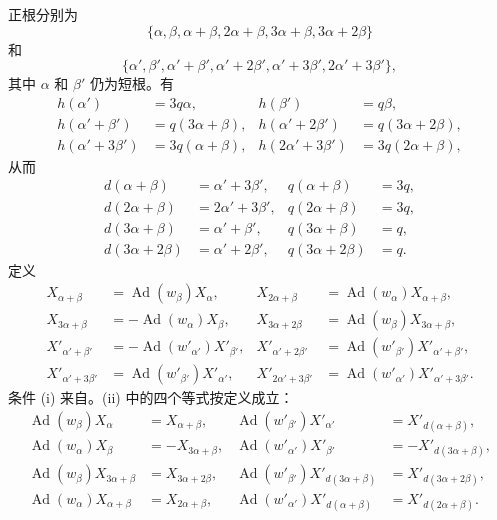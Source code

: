正根分别为
\[
\{\alpha,\beta,\alpha+\beta,2\alpha+\beta,3\alpha+\beta,
  3\alpha+2\beta\}
\]
和
\[
\{\alpha',\beta',\alpha'+\beta',\alpha'+2\beta',
  \alpha'+3\beta',2\alpha'+3\beta'\},
\]
其中 \(\alpha\) 和 \(\beta'\) 仍为短根。有
\[
\begin{aligned}
 h(\alpha')&=3q\alpha,&h(\beta')&=q\beta,\\
 h(\alpha'+\beta')&=q(3\alpha+\beta),&
 h(\alpha'+2\beta')&=q(3\alpha+2\beta),\\
 h(\alpha'+3\beta')&=3q(\alpha+\beta),&
 h(2\alpha'+3\beta')&=3q(2\alpha+\beta),
\end{aligned}
\]
从而
\[
\begin{aligned}
 d(\alpha+\beta)&=\alpha'+3\beta',&q(\alpha+\beta)&=3q,\\
 d(2\alpha+\beta)&=2\alpha'+3\beta',&q(2\alpha+\beta)&=3q,\\
 d(3\alpha+\beta)&=\alpha'+\beta',&q(3\alpha+\beta)&=q,\\
 d(3\alpha+2\beta)&=\alpha'+2\beta',&q(3\alpha+2\beta)&=q.
\end{aligned}
\]
定义
\[
\begin{aligned}
 X_{\alpha+\beta}&=\operatorname{Ad}(w_\beta)X_\alpha,&
 X_{2\alpha+\beta}&=\operatorname{Ad}(w_\alpha)X_{\alpha+\beta},\\
 X_{3\alpha+\beta}&=-\operatorname{Ad}(w_\alpha)X_\beta,&
 X_{3\alpha+2\beta}&=\operatorname{Ad}(w_\beta)X_{3\alpha+\beta},\\
 X'_{\alpha'+\beta'}&=-\operatorname{Ad}(w'_{\alpha'})X'_{\beta'},&
 X'_{\alpha'+2\beta'}&=\operatorname{Ad}(w'_{\beta'})X'_{\alpha'+\beta'},\\
 X'_{\alpha'+3\beta'}&=\operatorname{Ad}(w'_{\beta'})X'_{\alpha'},&
 X'_{2\alpha'+3\beta'}&=\operatorname{Ad}(w'_{\alpha'})X'_{\alpha'+3\beta'}.
\end{aligned}
\]
条件 (i) 来自。(ii) 中的四个等式按定义成立：
\[
\begin{aligned}
 \operatorname{Ad}(w_\beta)X_\alpha&=X_{\alpha+\beta},&
 \operatorname{Ad}(w'_{\beta'})X'_{\alpha'}&=X'_{d(\alpha+\beta)},\\
 \operatorname{Ad}(w_\alpha)X_\beta&=-X_{3\alpha+\beta},&
 \operatorname{Ad}(w'_{\alpha'})X'_{\beta'}&=-X'_{d(3\alpha+\beta)},\\
 \operatorname{Ad}(w_\beta)X_{3\alpha+\beta}&=X_{3\alpha+2\beta},&
 \operatorname{Ad}(w'_{\beta'})X'_{d(3\alpha+\beta)}
   &=X'_{d(3\alpha+2\beta)},\\
 \operatorname{Ad}(w_\alpha)X_{\alpha+\beta}&=X_{2\alpha+\beta},&
 \operatorname{Ad}(w'_{\alpha'})X'_{d(\alpha+\beta)}
   &=X'_{d(2\alpha+\beta)}.
\end{aligned}
\]
